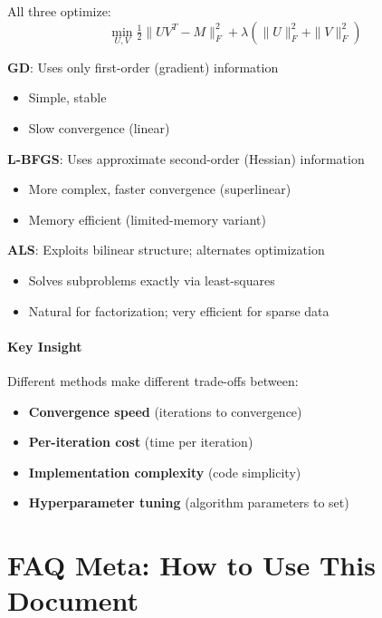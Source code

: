 \documentclass[11pt,oneside]{article}
\begin{document}
\begin{mdframed}[backgroundcolor=gray!10]
All three optimize:
\begin{equation*}
    \min_{U,V} \tfrac{1}{2}\|UV^T - M\|_F^2 + \lambda(\|U\|_F^2 + \|V\|_F^2)
\end{equation*}

\medskip

\textbf{GD}: Uses only first-order (gradient) information
\begin{itemize}
    \item Simple, stable
    \item Slow convergence (linear)
\end{itemize}

\textbf{L-BFGS}: Uses approximate second-order (Hessian) information
\begin{itemize}
    \item More complex, faster convergence (superlinear)
    \item Memory efficient (limited-memory variant)
\end{itemize}

\textbf{ALS}: Exploits bilinear structure; alternates optimization
\begin{itemize}
    \item Solves subproblems exactly via least-squares
    \item Natural for factorization; very efficient for sparse data
\end{itemize}
\end{mdframed}

\paragraph{Key Insight}

Different methods make different trade-offs between:
\begin{itemize}
    \item \textbf{Convergence speed} (iterations to convergence)
    \item \textbf{Per-iteration cost} (time per iteration)
    \item \textbf{Implementation complexity} (code simplicity)
    \item \textbf{Hyperparameter tuning} (algorithm parameters to set)
\end{itemize}

\section{FAQ Meta: How to Use This Document}\label{sec:meta}
\end{document}
